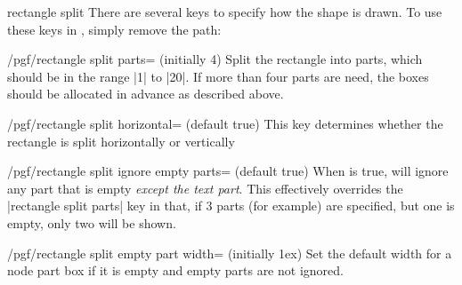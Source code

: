\begin{shape}{rectangle split}
  There are several \pgfname{} keys to specify how the shape is
  drawn. To use these keys in \tikzname, simply remove the
   path:

\begin{key}{/pgf/rectangle split parts= (initially 4)}
  Split the rectangle into  parts,
  which should be in the range |1| to |20|. If more than four parts
  are need, the boxes should be allocated in advance as
  described above.

\begin{codeexample}[]
\end{codeexample}
\end{key}

\begin{key}{/pgf/rectangle split horizontal= (default true)}
  This key determines whether the rectangle is split horizontally or vertically
 \end{key}

  \begin{key}{/pgf/rectangle split ignore empty parts= (default true)}
    When  is true, \pgfname{} will ignore any part
    that is empty \emph{except the text part}.
    This effectively overrides the |rectangle split parts| key in that, if
    3 parts (for example) are specified, but one is empty, only
    two will be shown.

\begin{codeexample}[]
\end{codeexample}
  \end{key}
%
	\begin{key}{/pgf/rectangle split empty part width= (initially 1ex)}
    Set the default width for a node part box if it is empty and
    empty parts are not ignored.
  \end{key}


\end{shape}
